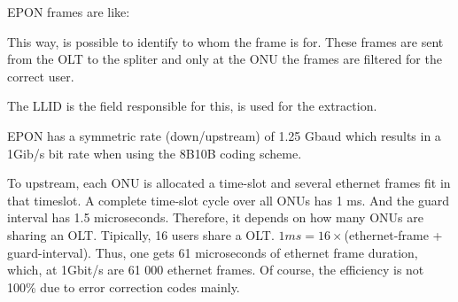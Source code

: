 EPON frames are like:

This way, is possible to identify to whom the frame is for. These frames are sent from the OLT to the spliter and only at the ONU the frames are filtered for the correct user.

The LLID is the field responsible for this, is used for the extraction.




EPON has a symmetric rate (down/upstream) of 1.25 Gbaud which results in a 1Gib/s bit rate when using the 8B10B coding scheme.

To upstream, each ONU is allocated a time-slot and several ethernet frames fit in that timeslot. A complete time-slot cycle over all ONUs has 1 ms. And the guard interval has 1.5 microseconds. Therefore, it depends on how many ONUs are sharing an OLT. Tipically, 16 users share a OLT. $1ms = 16 \times$(ethernet-frame + guard-interval). Thus, one gets 61 microseconds of ethernet frame duration, which, at 1Gbit/s are 61 000 ethernet frames. Of course, the efficiency is not 100\% due to error correction codes mainly.




